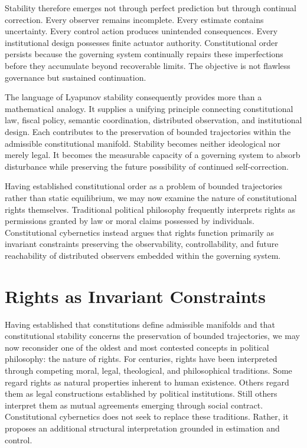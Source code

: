 \documentclass[12pt,a4paper]{article}
\begin{document}
Stability therefore emerges not through perfect prediction but through continual correction. Every observer remains incomplete. Every estimate contains uncertainty. Every control action produces unintended consequences. Every institutional design possesses finite actuator authority. Constitutional order persists because the governing system continually repairs these imperfections before they accumulate beyond recoverable limits. The objective is not flawless governance but sustained continuation.

The language of Lyapunov stability consequently provides more than a mathematical analogy. It supplies a unifying principle connecting constitutional law, fiscal policy, semantic coordination, distributed observation, and institutional design. Each contributes to the preservation of bounded trajectories within the admissible constitutional manifold. Stability becomes neither ideological nor merely legal. It becomes the measurable capacity of a governing system to absorb disturbance while preserving the future possibility of continued self-correction.

Having established constitutional order as a problem of bounded trajectories rather than static equilibrium, we may now examine the nature of constitutional rights themselves. Traditional political philosophy frequently interprets rights as permissions granted by law or moral claims possessed by individuals. Constitutional cybernetics instead argues that rights function primarily as invariant constraints preserving the observability, controllability, and future reachability of distributed observers embedded within the governing system.

\section{Rights as Invariant Constraints}

Having established that constitutions define admissible manifolds and that constitutional stability concerns the preservation of bounded trajectories, we may now reconsider one of the oldest and most contested concepts in political philosophy: the nature of rights. For centuries, rights have been interpreted through competing moral, legal, theological, and philosophical traditions. Some regard rights as natural properties inherent to human existence. Others regard them as legal constructions established by political institutions. Still others interpret them as mutual agreements emerging through social contract. Constitutional cybernetics does not seek to replace these traditions. Rather, it proposes an additional structural interpretation grounded in estimation and control.
\end{document}
